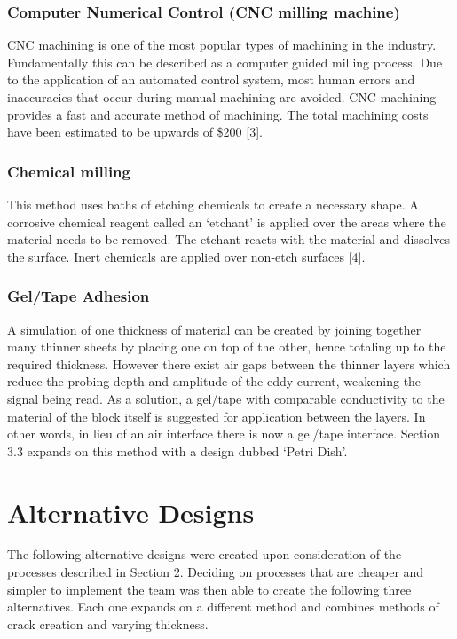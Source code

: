 \documentclass[12pt]{article}
\begin{document}
\subsubsection{Computer Numerical Control (CNC milling machine)}
CNC machining is one of the most popular types of machining in the industry. Fundamentally this can be described as a computer guided milling process. Due to the application of an automated control system, most human errors and inaccuracies that occur during manual machining are avoided. CNC machining provides a fast and accurate method of machining. The total machining costs have been estimated to be upwards of \$200 [3].  

\subsubsection{Chemical milling}
This method uses baths of etching chemicals to create a necessary shape. A corrosive chemical reagent called an `etchant' is applied over the areas where the material needs to be removed. The etchant reacts with the material and dissolves the surface. Inert chemicals are applied over non-etch surfaces [4].

\subsubsection{Gel/Tape Adhesion}
A simulation of one thickness of material can be created by joining together many thinner sheets by placing one on top of the other, hence totaling up to the required thickness. However there exist air gaps between the thinner layers which reduce the probing depth and amplitude of the eddy current, weakening the signal being read. As a solution, a gel/tape with comparable conductivity to the material of the block itself is suggested for application between the layers. In other words, in lieu of an air interface there is now a gel/tape interface. Section 3.3 expands on this method with a design dubbed `Petri Dish'.

\section{Alternative Designs}
The following alternative designs were created upon consideration of the processes described in Section 2. Deciding on processes that are cheaper and simpler to implement the team was then able to create the following three alternatives. Each one expands on a different method and combines methods of crack creation and varying thickness.
\end{document}
